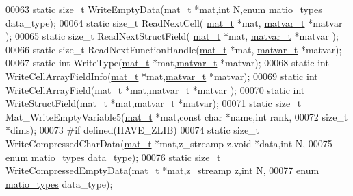 \begin{DoxyCode}
00063 \textcolor{keyword}{static} \textcolor{keywordtype}{size\_t} WriteEmptyData(\hyperlink{struct__mat__t}{mat\_t} *mat,\textcolor{keywordtype}{int} N,\textcolor{keyword}{enum} \hyperlink{group___m_a_t_gacf7b3b879282b7ab3a51190e49bf3453}{matio\_types} data\_type);
00064 \textcolor{keyword}{static} \textcolor{keywordtype}{size\_t} ReadNextCell( \hyperlink{struct__mat__t}{mat\_t} *mat, \hyperlink{group___m_a_t_structmatvar__t}{matvar\_t} *matvar );
00065 \textcolor{keyword}{static} \textcolor{keywordtype}{size\_t} ReadNextStructField( \hyperlink{struct__mat__t}{mat\_t} *mat, \hyperlink{group___m_a_t_structmatvar__t}{matvar\_t} *matvar );
00066 \textcolor{keyword}{static} \textcolor{keywordtype}{size\_t} ReadNextFunctionHandle(\hyperlink{struct__mat__t}{mat\_t} *mat, \hyperlink{group___m_a_t_structmatvar__t}{matvar\_t} *matvar);
00067 \textcolor{keyword}{static} \textcolor{keywordtype}{int}    WriteType(\hyperlink{struct__mat__t}{mat\_t} *mat,\hyperlink{group___m_a_t_structmatvar__t}{matvar\_t} *matvar);
00068 \textcolor{keyword}{static} \textcolor{keywordtype}{int}    WriteCellArrayFieldInfo(\hyperlink{struct__mat__t}{mat\_t} *mat,\hyperlink{group___m_a_t_structmatvar__t}{matvar\_t} *matvar);
00069 \textcolor{keyword}{static} \textcolor{keywordtype}{int}    WriteCellArrayField(\hyperlink{struct__mat__t}{mat\_t} *mat,\hyperlink{group___m_a_t_structmatvar__t}{matvar\_t} *matvar );
00070 \textcolor{keyword}{static} \textcolor{keywordtype}{int}    WriteStructField(\hyperlink{struct__mat__t}{mat\_t} *mat,\hyperlink{group___m_a_t_structmatvar__t}{matvar\_t} *matvar);
00071 \textcolor{keyword}{static} \textcolor{keywordtype}{size\_t} Mat\_WriteEmptyVariable5(\hyperlink{struct__mat__t}{mat\_t} *mat,\textcolor{keyword}{const} \textcolor{keywordtype}{char} *name,\textcolor{keywordtype}{int} rank,
00072                   \textcolor{keywordtype}{size\_t} *dims);
00073 \textcolor{preprocessor}{#if defined(HAVE\_ZLIB)}
00074 \textcolor{keyword}{static} \textcolor{keywordtype}{size\_t} WriteCompressedCharData(\hyperlink{struct__mat__t}{mat\_t} *mat,z\_streamp z,\textcolor{keywordtype}{void} *data,\textcolor{keywordtype}{int} N,
00075                   \textcolor{keyword}{enum} \hyperlink{group___m_a_t_gacf7b3b879282b7ab3a51190e49bf3453}{matio\_types} data\_type);
00076 \textcolor{keyword}{static} \textcolor{keywordtype}{size\_t} WriteCompressedEmptyData(\hyperlink{struct__mat__t}{mat\_t} *mat,z\_streamp z,\textcolor{keywordtype}{int} N,
00077                   \textcolor{keyword}{enum} \hyperlink{group___m_a_t_gacf7b3b879282b7ab3a51190e49bf3453}{matio\_types} data\_type);

\end{DoxyCode}
